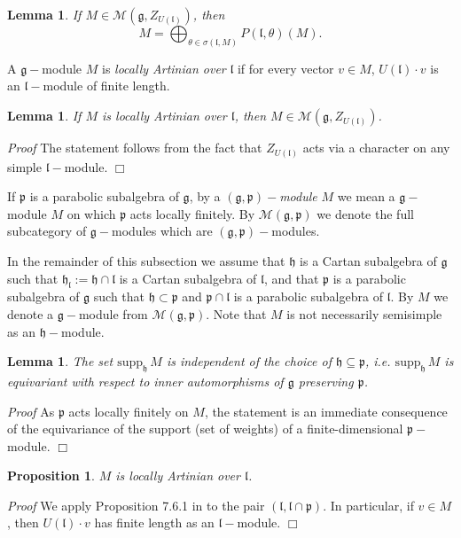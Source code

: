 \documentclass[default]{./styles/svmult}
\newtheorem{lem}[theo]{Lemma}
\newtheorem{prop}[theo]{Proposition}
\renewenvironment{proof}{ \emph{Proof}}{$\Box$}
\newcommand{\supp}{\mathrm{supp}}
\renewcommand{\gg}{\mathfrak{g}}
\newcommand{\hh}{\mathfrak{h}}
\renewcommand{\ll}{\mathfrak{l}}
\newcommand{\pp}{\mathfrak{p}}
\begin{document}
\begin{lem}\label{lem:1}
 If $M \in \mathcal{M}(\gg,Z_{U(\ll)})$, then 
 $$M = \bigoplus_{\theta \in \sigma(\ll,M)} P(\ll,\theta)(M).$$
\end{lem}

A $\gg-$module $M$ is \textit{locally Artinian over} $\ll$ if for every vector $v \in M$, $U(\ll)\cdot v$ is an $\ll-$module of finite length.

\begin{lem}\label{lem:2}
 If $M$ is locally Artinian over $\ll$, then $M \in \mathcal{M}(\gg, Z_{U(\ll)})$.
\end{lem}

\begin{proof}
The statement follows from the fact that $Z_{U(\ll)}$ acts via a character on any simple $\ll-$module.
\end{proof}

If $\pp$ is a parabolic subalgebra of $\gg$, by a $(\gg,\pp)-$\textit{module} $M$ we mean a $\gg-$module $M$ on which $\pp$ acts locally finitely. By $\mathcal{M}(\gg,\pp)$ we denote the full subcategory of $\gg-$modules which are $(\gg,\pp)-$modules.

In the remainder of this subsection we assume that $\hh$ is a Cartan subalgebra of $\gg$ such that $\hh_\ll :=  \hh \cap \ll$ is a Cartan subalgebra of $\ll$, and that $\pp$ is a parabolic subalgebra of $\gg$ such that $\hh \subset \pp$ and $\pp \cap \ll$ is a parabolic subalgebra of $\ll$. By $M$ we denote a $\gg-$module from $\mathcal{M}(\gg,\pp)$. Note that $M$ is not necessarily semisimple as an $\hh-$module.

\begin{lem}\label{lemma:3}
 The set $\supp_\hh\, M$ is independent of the choice of $\hh \subseteq \pp$, i.e. $\supp_\hh\, M$ is equivariant with respect to inner automorphisms of $\gg$ preserving $\pp$.
\end{lem}

\begin{proof}
 As $\pp$ acts locally finitely on $M$, the statement is an immediate consequence of the equivariance of the support (set of weights) of a finite-dimensional $\pp-$module.
\end{proof}

\begin{prop}\label{prop:1}
 $M$ is locally Artinian over $\ll$.
\end{prop}

\begin{proof}
 We apply Proposition 7.6.1 in \cite{Dix} to the pair $(\ll, \ll\cap\pp)$. In particular, if $v \in M$, then $U(\ll) \cdot v$ has finite length as an $\ll-$module.
\end{proof}
\end{document}
